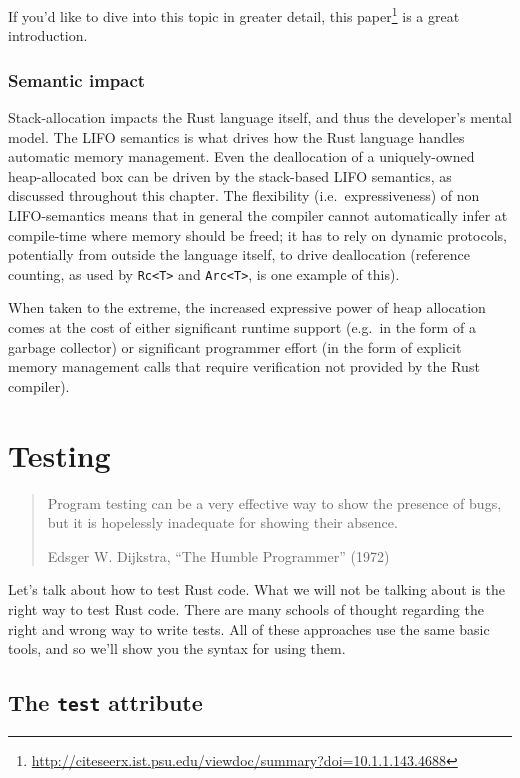 \documentclass[a4paper,]{book}
\renewcommand{\href}[2]{#2\footnote{\url{#1}}}
\begin{document}
If you'd like to dive into this topic in greater detail,
\href{http://citeseerx.ist.psu.edu/viewdoc/summary?doi=10.1.1.143.4688}{this
paper} is a great introduction.

\subsubsection{Semantic impact}\label{semantic-impact}

Stack-allocation impacts the Rust language itself, and thus the
developer's mental model. The LIFO semantics is what drives how the Rust
language handles automatic memory management. Even the deallocation of a
uniquely-owned heap-allocated box can be driven by the stack-based LIFO
semantics, as discussed throughout this chapter. The flexibility
(i.e.~expressiveness) of non LIFO-semantics means that in general the
compiler cannot automatically infer at compile-time where memory should
be freed; it has to rely on dynamic protocols, potentially from outside
the language itself, to drive deallocation (reference counting, as used
by \texttt{Rc\textless{}T\textgreater{}} and
\texttt{Arc\textless{}T\textgreater{}}, is one example of this).

When taken to the extreme, the increased expressive power of heap
allocation comes at the cost of either significant runtime support
(e.g.~in the form of a garbage collector) or significant programmer
effort (in the form of explicit memory management calls that require
verification not provided by the Rust compiler).

\hypertarget{sec--testing}{\section{Testing}\label{sec--testing}}

\begin{quote}
Program testing can be a very effective way to show the presence of
bugs, but it is hopelessly inadequate for showing their absence.

Edsger W. Dijkstra, ``The Humble Programmer'' (1972)
\end{quote}

Let's talk about how to test Rust code. What we will not be talking
about is the right way to test Rust code. There are many schools of
thought regarding the right and wrong way to write tests. All of these
approaches use the same basic tools, and so we'll show you the syntax
for using them.

\subsection{\texorpdfstring{The \texttt{test}
attribute}{The test attribute}}\label{the-test-attribute}
\end{document}
